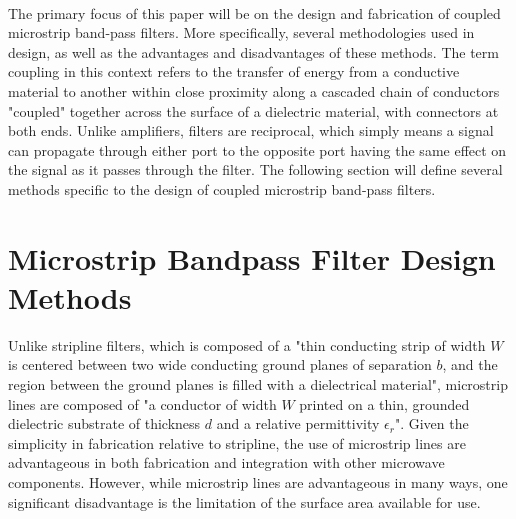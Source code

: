 \documentclass{article}
\begin{document}
\text{ }\\
The primary focus of this paper will be on the design and fabrication of coupled microstrip band-pass filters. More specifically, several methodologies used in design, as well as the advantages and disadvantages of these methods. The term coupling in this context refers to the transfer of energy from a conductive material to another within close proximity along a cascaded chain of conductors "coupled" together across the surface of a dielectric material, with connectors at both ends\cite{circuits}. Unlike amplifiers, filters are reciprocal, which simply means a signal can propagate through either port to the opposite port having the same effect on the signal as it passes through the filter. The following section will define several methods specific to the design of coupled microstrip band-pass filters.

\section{Microstrip Bandpass Filter Design Methods}
Unlike stripline filters, which is composed of a "thin conducting strip of width $W$ is centered between two wide conducting ground planes of separation $b$, and the region between the ground planes is filled with a dielectrical material"\cite{Pozar}, microstrip lines are composed of "a conductor of width $W$ printed on a thin, grounded dielectric substrate of thickness $d$ and a relative permittivity $\epsilon_r$"\cite{Pozar}. Given the simplicity in fabrication relative to stripline, the use of microstrip lines are advantageous in both fabrication and integration with other microwave components. However, while microstrip lines are advantageous in many ways, one significant disadvantage is the limitation of the surface area available for use.
\end{document}

